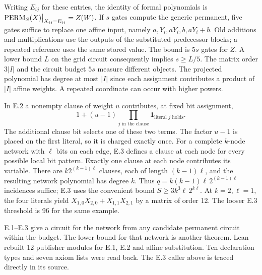 Writing $E_{ij}$ for these entries, the identity of formal polynomials is
$\mathrm{PERM}_S(X)\big|_{X_{ij}=E_{ij}}=Z(W)$. If $s$ gates compute the generic
permanent, five gates suffice to replace one affine input, namely
$a,Y_i,aY_i,b,aY_i+b$. Old additions and multiplications use the outputs
of the substituted predecessor blocks; a repeated reference uses the
same stored value. The bound is $5s$ gates for $Z$. A lower bound $L$ on
the grid circuit consequently implies $s\ge L/5$.
The matrix order $3|I|$ and the circuit budget $5s$ measure different
objects. The projected polynomial has degree at most $|I|$ since each
assignment contributes a product of $|I|$ affine weights. A repeated
coordinate can occur with higher powers.

In E.2 a nonempty clause of weight $u$ contributes, at fixed bit assignment,
\[
   1+(u-1)\prod_{j\text{ in the clause}}
                    \mathbf{1}_{\text{literal }j\text{ holds}} .
\]
The additional clause bit selects one of these two terms. The factor
$u-1$ is placed on the first literal, so it is charged exactly once.
For a complete $k$-node network with $\ell$ bits on each edge, E.3
defines a clause at each node for every possible local bit pattern.
Exactly one clause at each node contributes its variable. There are
$k2^{(k-1)\ell}$ clauses, each of length $(k-1)\ell$, and the resulting
network polynomial has degree $k$. Thus $q=k(k-1)\ell\,2^{(k-1)\ell}$
incidences suffice; E.3 uses the convenient bound
$S\ge3k^3\ell\,2^{k\ell}$. At $k=2,\ell=1$, the four literals yield
$X_{1,0}X_{2,0}+X_{1,1}X_{2,1}$ by a matrix of order 12. The looser
E.3 threshold is 96 for the same example.

E.1--E.3 give a circuit for the network from any candidate permanent
circuit within the budget. The lower bound for that network is another
theorem. Lean rebuilt 12 publisher modules for E.1, E.2 and affine substitution.
Ten declaration types and seven axiom lists were read back. The E.3 caller
above is traced directly in its source.

